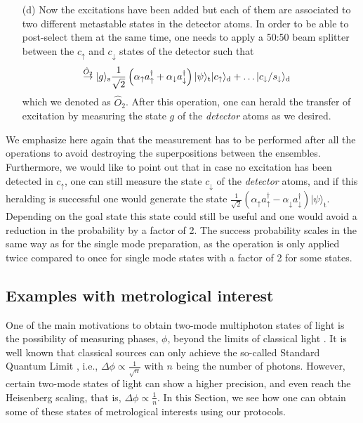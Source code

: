 \documentclass[twocolumn,pra,aps,superscriptaddress,showpacs]{revtex4-1}
\newcommand{\ket}[1]{|#1\rangle}
\newcommand{\rs}{\mathrm{s}}
\newcommand{\rd}{\mathrm{d}}
\newcommand{\rt}{\mathrm{t}}
\begin{document}
\begin{itemize}
	\item [ (d)] Now the excitations have been added but each of them are associated to two different metastable states in the detector atoms. In order to be able to post-select them at the same time,  one needs to apply a 50:50 beam splitter between the $c_\uparrow$ and $c_\downarrow$ states of the detector such that
	\begin{align}
 		&\stackrel{\hat{O}_2}{\rightarrow}
		\ket{g}_\rs \frac{1}{\sqrt{2}} \left(\alpha_\uparrow a_\uparrow^\dagger + \alpha_\downarrow a_\downarrow^\dagger\right) \ket{\psi}_\rt \ket{c_\uparrow}_\rd
		+ \ldots \ket{c_\downarrow/s_\downarrow}_\rd \notag 
	 \end{align} 
	 which we denoted as $\hat{O}_2$. After this operation, one can herald the transfer of excitation by measuring the state $g$ of the \emph{detector} atoms as we desired.
	 
	\end{itemize}

We emphasize here again that the measurement has to be performed after all the operations to avoid destroying the superpositions between the ensembles.
Furthermore, we would like to point out that in case no excitation has been detected in $c_\uparrow$, one can still measure the state $c_\downarrow$ of the \emph{detector} atoms, and if this heralding is successful one would generate the state $\frac{1}{\sqrt{2}} \left(\alpha_\uparrow a_\uparrow^\dagger - \alpha_\downarrow a_\downarrow^\dagger\right) \ket{\psi}_\rt$. Depending on the goal state this state could still be useful and one would avoid a reduction in the probability by a factor of 2.
The success probability scales in the same way as for the single mode preparation, as the operation is only applied twice compared to once for single mode states with a factor of 2 for some states.

\subsection{Examples with metrological interest}

One of the main motivations to obtain two-mode multiphoton states of light is the possibility of measuring phases, $\phi$, beyond the limits of classical light \cite{demkowicz-dobrzanski15}. It is well known that classical sources can only achieve the so-called Standard Quantum Limit , i.e., $\Delta \phi \propto \frac{1}{\sqrt{n}}$ with $n$ being the number of photons. However, certain two-mode states of light can show a higher precision, and even reach the Heisenberg scaling, that is, $\Delta \phi \propto \frac{1}{n}$. In this Section, we see how one can obtain some of these states of metrological interests using our protocols.
\end{document}
